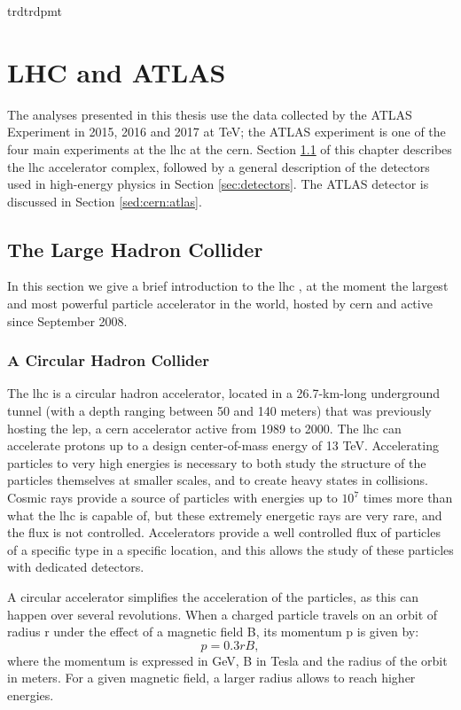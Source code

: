 \gls{trd}\gls{trd}\gls{pmt}\chapter{LHC and ATLAS}
\label{chap:cern}

The analyses presented in this thesis use the data collected by the ATLAS Experiment in 2015, 2016 and 2017 at \cmtre TeV; the ATLAS experiment is one of the four main experiments at the \gls{lhc} at the \gls{cern}. Section \ref{sed:cern:lhc} of this chapter describes the \gls{lhc} accelerator complex, followed by a general description of the detectors used in high-energy physics in Section \ref{sec:detectors}. The ATLAS detector is discussed in Section \ref{sed:cern:atlas}.


\section{The Large Hadron Collider}
\label{sed:cern:lhc}

In this section we give a brief introduction to the \gls{lhc} \cite{1748-0221-3-08-S08001}, at the moment the largest and most powerful particle accelerator in the world, hosted by \gls{cern} and active since September 2008.


\subsection{A Circular Hadron Collider}

The \gls{lhc} is a circular hadron accelerator, located in a 26.7-km-long underground tunnel (with a depth ranging between 50 and 140 meters) that was previously hosting the \gls{lep}, a \gls{cern} accelerator active from 1989 to 2000. The \gls{lhc} can accelerate protons up to a design center-of-mass energy of 13 TeV. Accelerating particles to very high energies is necessary to both study the structure of the particles themselves at smaller scales, and to create heavy states in collisions. Cosmic rays provide a source of particles with energies up to $10^7$ times more than what the \gls{lhc} is capable of, but these extremely energetic rays are very rare, and the flux is not controlled. Accelerators provide a well controlled flux of particles of a specific type in a specific location, and this allows the study of these particles with dedicated detectors.

A circular accelerator simplifies the acceleration of the particles, as this can happen over several revolutions. When a charged particle travels on an orbit of radius r under the effect of a magnetic field B, its momentum p is given by:
\begin{equation}
\label{eq:cern:p03br}
p = 0.3 r B,
\end{equation}
\noindent where the momentum is expressed in GeV, B in Tesla and the radius of the orbit in meters. For a given magnetic field, a larger radius allows to reach higher energies. 

